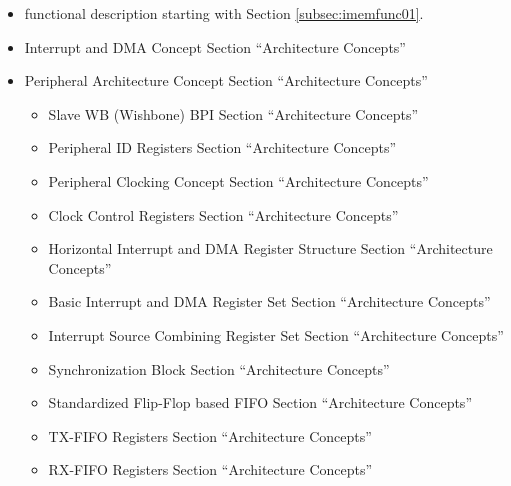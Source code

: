 \begin{itemize}
  \item \asimemg functional description starting with Section \ref{subsec:imemfunc01}.
  \item Interrupt and DMA Concept Section ``Architecture Concepts''
  \item Peripheral Architecture Concept Section ``Architecture Concepts''
  \begin{itemize}
    \item Slave WB (Wishbone) BPI Section ``Architecture Concepts''
    \item Peripheral ID Registers Section ``Architecture Concepts''
    \item Peripheral Clocking Concept Section ``Architecture Concepts''
    \item Clock Control Registers Section ``Architecture Concepts''
    \item Horizontal Interrupt and DMA Register Structure Section ``Architecture Concepts''
    \item Basic Interrupt and DMA Register Set Section ``Architecture Concepts''
    \item Interrupt Source Combining Register Set Section ``Architecture Concepts''
    \item Synchronization Block Section ``Architecture Concepts''
    \item Standardized Flip-Flop based FIFO Section ``Architecture Concepts''
    \item TX-FIFO Registers Section ``Architecture Concepts''
    \item RX-FIFO Registers Section ``Architecture Concepts''
  \end{itemize}
\end{itemize}
